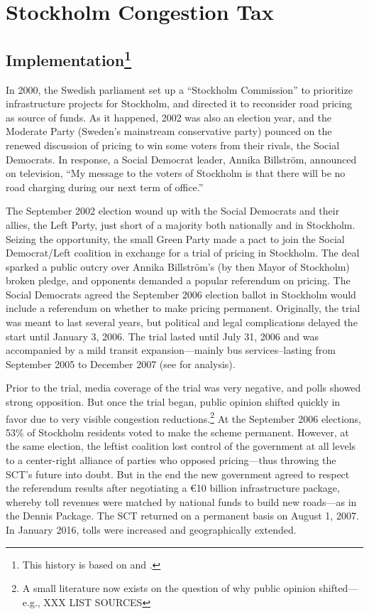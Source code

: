 \section{Stockholm Congestion Tax}\label{sec:stockholm}

\subsection{Implementation\protect\footnote{This history is based on \citet{Eliasson2009b} and \citet{GullbergIsaksson2009}.}}

In 2000, the Swedish parliament set up a ``Stockholm Commission'' to  prioritize infrastructure projects for Stockholm, and directed it to reconsider road pricing as source of funds. As it happened, 2002 was also an election year, and the Moderate Party (Sweden's mainstream conservative party) pounced on the renewed discussion of pricing to win some voters from their rivals, the Social Democrats. In response, a Social Democrat leader, Annika Billstr\"om, announced on television, ``My message to the voters of Stockholm is that there will be no road charging during our next term of office.'' 

The September 2002 election wound up with the Social Democrats and their allies, the Left Party, just short of a majority both nationally and in Stockholm. Seizing the opportunity, the small Green Party made a pact to join the Social Democrat/Left coalition in exchange for a trial of pricing in Stockholm. The deal sparked a public outcry over Annika Billstr\"om's (by then Mayor of Stockholm) broken pledge, and opponents demanded a popular referendum on pricing. The Social Democrats agreed the September 2006 election ballot in Stockholm would include a referendum on whether to make pricing permanent. Originally, the trial was meant to last several years, but political and legal complications delayed the start until January 3, 2006. The trial lasted until July 31, 2006 and was accompanied by a mild transit expansion---mainly bus services--lasting from September 2005 to December 2007 (see \citet{Kottenhoff2009} for analysis).

Prior to the trial, media coverage of the trial was very negative, and polls showed strong opposition. But once the trial began, public opinion shifted quickly in favor due to very visible congestion reductions.\footnote{A small literature now exists on the question of why public opinion shifted---e.g., XXX LIST SOURCES} At the September 2006 elections, 53\% of Stockholm residents voted to make the scheme permanent. However, at the same election, the leftist coalition lost control of the government at all levels to a center-right alliance of parties who opposed pricing---thus throwing the SCT's future into doubt.  But in the end the new government agreed to respect the referendum results after negotiating a \euro 10 billion infrastructure package, whereby toll revenues were matched by national funds to build new roads---as in the Dennis Package. The SCT returned on a permanent basis on August 1, 2007. In January 2016, tolls were increased and geographically extended.

